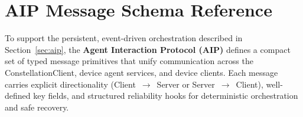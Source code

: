 \documentclass[10pt]{article} %
\newcommand{\ufo}{\textsc{UFO}$^3$\xspace}
\newcommand{\TaskConstellation}{\textsc{TaskConstellation}\xspace}
\begin{document}



\section{AIP Message Schema Reference}
\label{app:aip-messages}

To support the persistent, event-driven orchestration described in Section~\ref{sec:aip}, the \textbf{Agent Interaction Protocol (AIP)} defines a compact set of typed message primitives that unify communication across the ConstellationClient, device agent services, and device clients. 
Each message carries explicit directionality (Client~$\to$~Server or Server~$\to$~Client), well-defined key fields, and structured reliability hooks for deterministic orchestration and safe recovery.
\end{document}
